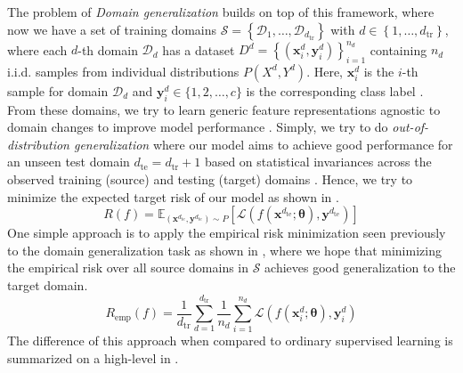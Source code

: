 The problem of \emph{Domain generalization} builds on top of this framework, where now we have a set of training domains $\mathcal{S} = \left\{\mathcal{D}_{1}, \ldots, \mathcal{D}_{d_{\mathrm{tr}}}\right\}$ with $d \in\left\{1, \ldots, d_{\mathrm{tr}}\right\}$, where each $d$-th domain $\mathcal{D}_d$ has a dataset $D^{d}=\left\{\left(\mathbf{x}_{i}^{d}, \mathbf{y}_{i}^{d}\right)\right\}_{i=1}^{n_{d}}$ containing $n_d$ i.i.d. samples from individual distributions $P\left(X^{d}, Y^{d}\right)$. Here, $\mathbf{x}_i^d$ is the $i$-th sample for domain $\mathcal{D}_d$ and $\mathbf{y}_i^d \in\{1,2, \ldots, c\}$ is the corresponding class label \citep{wang2020learning}. From these domains, we try to learn generic feature representations agnostic to domain changes to improve model performance \citep{seo2019learning}. Simply, we try to do \emph{out-of-distribution generalization} where our model aims to achieve good performance for an unseen test domain $d_{\mathrm{te}}=d_{\mathrm{tr}}+1$ based on statistical invariances across the observed training (source) and testing (target) domains \citep{gulrajani2020search, huang2020selfchallenging}. Hence, we try to minimize the expected target risk of our model as shown in .
\begin{equation}
\label{eq:domain_risk}
    R(f) = \mathbb{E}_{(\mathbf{x}^{d_{\mathrm{te}}}, \mathbf{y}^{d_{\mathrm{te}}}) \sim P}[\mathcal{L}(f(\mathbf{x}^{d_{\mathrm{te}}}; \boldsymbol{\theta}), \mathbf{y}^{d_{\mathrm{te}}})]
\end{equation}
One simple approach is to apply the empirical risk minimization seen previously to the domain generalization task as shown in , where we hope that minimizing the empirical risk over all source domains in $\mathcal{S}$ achieves good generalization to the target domain.
\begin{equation}
\label{eq:domain_risk_emp}
    R_\mathrm{emp}(f) = \frac{1}{d_\mathrm{tr}} \sum_{d=1}^{d_\mathrm{tr}} \frac{1}{n_d} \sum_{i=1}^{n_d} \mathcal{L}(f(\mathbf{x}_i^{d}; \boldsymbol{\theta}), \mathbf{y}_i^{d})
\end{equation}
The difference of this approach when compared to ordinary supervised learning is summarized on a high-level in . 


